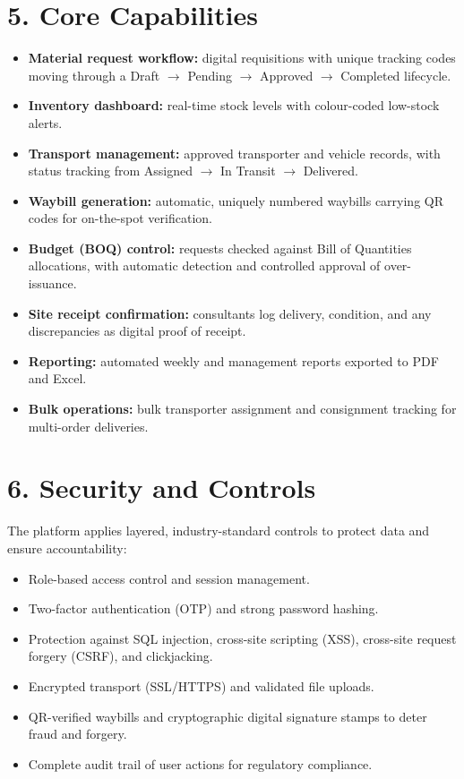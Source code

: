 \documentclass[11pt,a4paper]{article}
\begin{document}
\section{5. Core Capabilities}
\begin{itemize}
  \item \textbf{Material request workflow:} digital requisitions with unique tracking codes moving through a Draft $\rightarrow$ Pending $\rightarrow$ Approved $\rightarrow$ Completed lifecycle.
  \item \textbf{Inventory dashboard:} real-time stock levels with colour-coded low-stock alerts.
  \item \textbf{Transport management:} approved transporter and vehicle records, with status tracking from Assigned $\rightarrow$ In Transit $\rightarrow$ Delivered.
  \item \textbf{Waybill generation:} automatic, uniquely numbered waybills carrying QR codes for on-the-spot verification.
  \item \textbf{Budget (BOQ) control:} requests checked against Bill of Quantities allocations, with automatic detection and controlled approval of over-issuance.
  \item \textbf{Site receipt confirmation:} consultants log delivery, condition, and any discrepancies as digital proof of receipt.
  \item \textbf{Reporting:} automated weekly and management reports exported to PDF and Excel.
  \item \textbf{Bulk operations:} bulk transporter assignment and consignment tracking for multi-order deliveries.
\end{itemize}

\section{6. Security and Controls}
The platform applies layered, industry-standard controls to protect data and
ensure accountability:

\begin{itemize}
  \item Role-based access control and session management.
  \item Two-factor authentication (OTP) and strong password hashing.
  \item Protection against SQL injection, cross-site scripting (XSS), cross-site request forgery (CSRF), and clickjacking.
  \item Encrypted transport (SSL/HTTPS) and validated file uploads.
  \item QR-verified waybills and cryptographic digital signature stamps to deter fraud and forgery.
  \item Complete audit trail of user actions for regulatory compliance.
\end{itemize}
\end{document}
